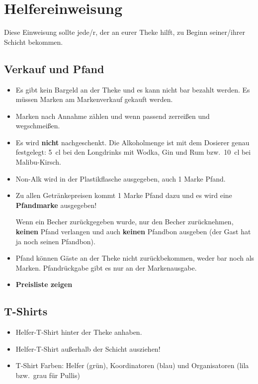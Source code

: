 \section{Helfereinweisung}
Diese Einweisung sollte jede/r, der an eurer Theke hilft, zu Beginn seiner/ihrer Schicht bekommen.
\subsection{Verkauf und Pfand}
\begin{itemize}
  \renewcommand{\labelitemi}{$\Box$}
  \item Es gibt kein Bargeld an der Theke und es kann nicht bar bezahlt werden. Es müssen Marken am Markenverkauf gekauft werden.
  \item Marken nach Annahme zählen und wenn passend zerreißen und wegschmeißen.
  \item Es wird \textbf{nicht} nachgeschenkt. Die Alkoholmenge ist mit dem Dosierer genau festgelegt: \SI{5}{\centi\litre} bei den Longdrinks mit Wodka, Gin und Rum bzw.\ \SI{10}{\centi\litre} bei Malibu-Kirsch.
  \item Non-Alk wird in der Plastikflasche ausgegeben, auch 1 Marke Pfand.
  \item Zu allen Getränkepreisen kommt 1 Marke Pfand dazu und es wird eine \textbf{Pfandmarke} ausgegeben!
    
    Wenn ein Becher zurückgegeben wurde, nur den Becher zurücknehmen, \textbf{keinen} Pfand verlangen und auch \textbf{keinen} Pfandbon ausgeben (der Gast hat ja noch seinen Pfandbon).
  \item Pfand können Gäste an der Theke nicht zurückbekommen, weder bar noch als Marken. Pfandrückgabe gibt es nur an der Markenausgabe.
  \item \textbf{Preisliste zeigen}
\end{itemize}
\subsection{T-Shirts}
\begin{itemize}
  \renewcommand{\labelitemi}{$\Box$}
  \item Helfer-T-Shirt hinter der Theke anhaben.
  \item Helfer-T-Shirt außerhalb der Schicht ausziehen!
  \item T-Shirt Farben: Helfer (grün), Koordinatoren (blau) und Organisatoren (lila bzw.\ grau für Pullis)
\end{itemize}
